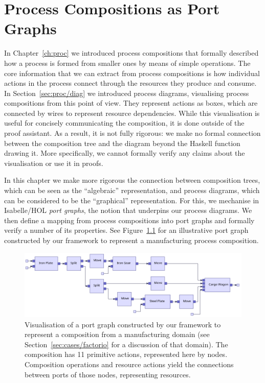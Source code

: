 \documentclass[class=smolathesis,crop=false]{standalone}
\begin{document}
\chapter{Process Compositions as Port Graphs}
\label{ch:port_graphs}

In Chapter~\ref{ch:proc} we introduced process compositions that formally described how a process is formed from smaller ones by means of simple operations.
The core information that we can extract from process compositions is how individual actions in the process connect through the resources they produce and consume.
In Section~\ref{sec:proc/diag} we introduced process diagrams, visualising process compositions from this point of view.
They represent actions as boxes, which are connected by wires to represent resource dependencies.
While this visualisation is useful for concisely communicating the composition, it is done outside of the proof assistant.
As a result, it is not fully rigorous: we make no formal connection between the composition tree and the diagram beyond the Haskell function drawing it.
More specifically, we cannot formally verify any claims about the visualisation or use it in proofs.

In this chapter we make more rigorous the connection between composition trees, which can be seen as the ``algebraic'' representation, and process diagrams, which can be considered to be the ``graphical'' representation.
For this, we mechanise in Isabelle/HOL \emph{port graphs}, the notion that underpins our process diagrams.
We then define a mapping from process compositions into port graphs and formally verify a number of its properties.
See Figure~\ref{fig:cargo_port_graph} for an illustrative port graph constructed by our framework to represent a manufacturing process composition.

\begin{figure}[htbp]
  \centering
  \includegraphics[width=\textwidth]{img/cargo_port_graph.png}
  \caption{
    Visualisation of a port graph constructed by our framework to represent a composition from a manufacturing domain (see Section~\ref{sec:cases/factorio} for a discussion of that domain).
    The composition has 11 primitive actions, represented here by nodes.
    Composition operations and resource actions yield the connections between ports of those nodes, representing resources.
  }
  \label{fig:cargo_port_graph}
\end{figure}
\end{document}
